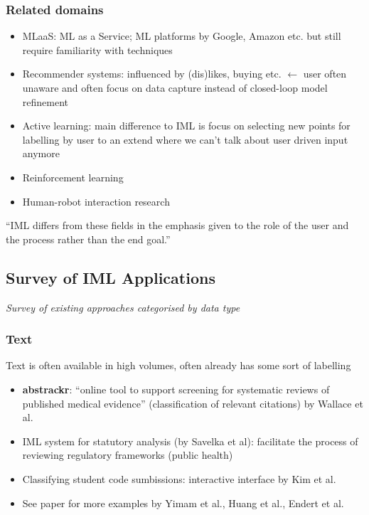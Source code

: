 \documentclass[12pt,a4paper]{article}
\begin{document}
\subsubsection{Related domains}
\begin{itemize}
\item MLaaS: ML as a Service; ML platforms by Google, Amazon etc. but still require familiarity with techniques
\item Recommender systems: influenced by (dis)likes, buying etc. $\leftarrow$ user often unaware and often focus on data capture instead of closed-loop model refinement
\item Active learning: main difference to IML is focus on selecting new points for labelling by user to an extend where we can't talk about user driven input anymore
\item Reinforcement learning
\item Human-robot interaction research
\end{itemize}
\begin{description}
\item ``IML differs from these fields in the emphasis given to the role of the user and the process rather than the end goal.''
\end{description}
%
\subsection{Survey of IML Applications}
\textit{Survey of existing approaches categorised by data type}
\subsubsection{Text}
\begin{description}
\item Text is often available in high volumes, often already has some sort of labelling
\end{description}
\begin{itemize}
\item \textbf{abstrackr}: ``online tool to support screening for systematic reviews of published medical evidence'' (classification of relevant citations) by Wallace et al.
\item IML system for statutory analysis (by Savelka et al): facilitate the process of reviewing regulatory frameworks (public health)
\item Classifying student code sumbissions: interactive interface by Kim et al.
\item See paper for more examples by Yimam et al., Huang et al., Endert et al.
\end{itemize}
\end{document}
